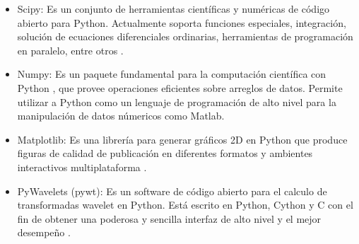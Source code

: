 \documentclass[11pt,lettersize]{article} %
\begin{document}
\begin{itemize}[nolistsep]
	\item Scipy: Es un conjunto de herramientas científicas y numéricas de código abierto para Python. Actualmente soporta funciones especiales, integración, solución de ecuaciones diferenciales ordinarias, herramientas de programación en paralelo, entre otros \cite{Scipy}.
	\item Numpy: Es un paquete fundamental para la computación científica con Python \cite{Numpy}, que provee operaciones eficientes sobre arreglos de datos. Permite utilizar a Python como un lenguaje de programación de alto nivel para la manipulación de datos númericos como Matlab\textregistered \cite{Scipy}.
	\item Matplotlib: Es una librería para generar gráficos 2D en Python que produce figuras de calidad de publicación en diferentes formatos y ambientes interactivos multiplataforma \cite{Matplotlib}.
	\item PyWavelets (pywt): Es un software de código abierto para el calculo de transformadas wavelet en Python. Está escrito en Python, Cython y C con el fin de obtener una poderosa y sencilla interfaz de alto nivel y el mejor desempeño \cite{pywt}.
\end{itemize}
\end{document}
